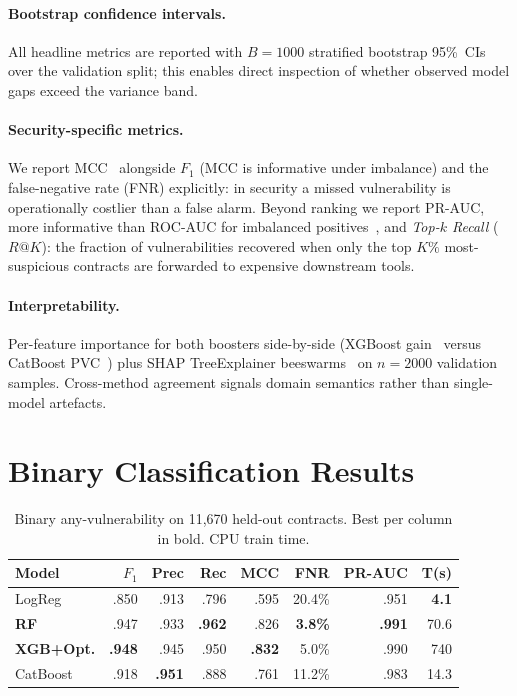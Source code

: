\documentclass[twocolumn, 10pt]{article}
\begin{document}
\paragraph{Bootstrap confidence intervals.}
All headline metrics are reported with $B\!=\!1000$ stratified
bootstrap 95\%~CIs over the validation split; this enables direct
inspection of whether observed model gaps exceed the variance band.

\paragraph{Security-specific metrics.}
We report MCC~\cite{mcc} alongside $F_1$ (MCC is informative under
imbalance) and the false-negative rate (FNR) explicitly: in security a
missed vulnerability is operationally costlier than a false alarm.
Beyond ranking we report PR-AUC, more informative than ROC-AUC for
imbalanced positives~\cite{prauc}, and \emph{Top-$k$ Recall} ($R@K$):
the fraction of vulnerabilities recovered when only the top $K\%$
most-suspicious contracts are forwarded to expensive downstream tools.

\paragraph{Interpretability.}
Per-feature importance for both boosters side-by-side (XGBoost
gain~\cite{xgboost} versus CatBoost PVC~\cite{catboost}) plus SHAP
TreeExplainer beeswarms~\cite{shap} on $n\!=\!2000$ validation
samples. Cross-method agreement signals domain semantics rather than
single-model artefacts.

\section{Binary Classification Results}\label{sec:results}

\begin{table}[t]
\centering
\caption{Binary any-vulnerability on 11{,}670 held-out contracts.
Best per column in bold. CPU train time.}
\label{tab:binary}
\setlength{\tabcolsep}{2.2pt}
\footnotesize
\begin{tabular}{lrrrrrrr}
\toprule
Model & $F_1$ & Prec & Rec & MCC & FNR & PR-AUC & T(s) \\
\midrule
LogReg     & .850 & .913 & .796 & .595 & 20.4\% & .951 & \textbf{4.1} \\
\textbf{RF}& .947 & .933 & \textbf{.962}
           & .826 & \textbf{3.8\%} & \textbf{.991} & 70.6 \\
\textbf{XGB+Opt.} & \textbf{.948} & .945 & .950
           & \textbf{.832} & 5.0\% & .990 & 740 \\
CatBoost   & .918 & \textbf{.951} & .888 & .761 & 11.2\% & .983 & 14.3 \\
\bottomrule
\end{tabular}
\end{table}
\end{document}

